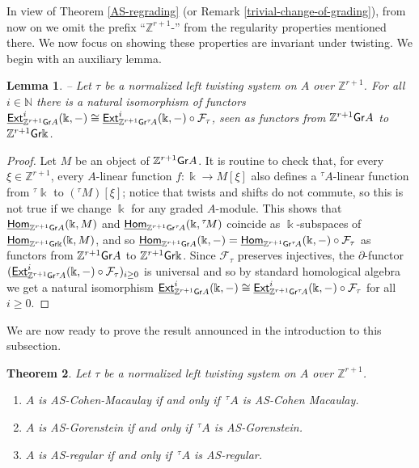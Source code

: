 \documentclass[twoside,11pt]{article}
\renewcommand{\k}{\Bbbk}
\newcommand{\N}{{\mathbb N}}
\newcommand{\Z}{{\mathbb Z}}
\newcommand{\F}{{\mathcal F}}
\newcommand{\GrMod}{{\sf Gr}}
\newcommand{\HOM}{\underline{{\sf Hom}}}
\newcommand{\EXT}{\underline{\sf Ext}}
\newtheorem{subtheorem}{Theorem}[subsection]
\newtheorem{sublemma}[subtheorem]{Lemma}
\begin{document}
In view of Theorem \ref{AS-regrading} (or Remark \ref{trivial-change-of-grading}), from
now on we omit the prefix ``$\Z^{r+1}$-'' from the regularity properties mentioned there.
We now focus on showing these properties are invariant under twisting. We begin with an
auxiliary lemma.

\begin{sublemma} -- \label{iso-pre-chi} Let $\tau$ be a normalized left twisting system on
	$A$ over $\Z^{r+1}$. For all $i\in\N$ there is a natural isomorphism of functors
	$\EXT^i_{\Z^{r+1}\GrMod A }(\k,-) \cong \EXT^i_{\Z^{r+1}\GrMod {}^\tau\!A}(\k,-)
	\circ \F_\tau$, seen as functors from $\Z^{r+1}\GrMod A$ to $\Z^{r+1}\GrMod\k$.
\end{sublemma}

\begin{proof} 
Let $M$ be an object of $\Z^{r+1}\GrMod A$. It is routine to check that, for every
$\xi \in \Z^{r+1}$, every $A$-linear function $f: \k \to M[\xi]$ also defines a ${}^\tau
A$-linear function from ${}^\tau \k$ to $({}^\tau M) [\xi]$; notice that twists and shifts
do not commute, so this is not true if we change $\k$ for any graded $A$-module. This
shows that $\HOM_{\Z^{r+1}\GrMod A}(\k,M)$ and $\HOM_{\Z^{r+1}\GrMod{}^\tau\!
A}(\k,{}^\tau\! M)$ coincide as $\k$-subspaces of $\HOM_{\Z^{r+1}\GrMod\k}(\k,M)$, and so
$\HOM_{\Z^{r+1}\GrMod A}(\k,-) = \HOM_{\Z^{r+1}\GrMod{}^\tau\!A}(\k,-) \circ \F_\tau$ as
functors from $\Z^{r+1}\GrMod A$ to $\Z^{r+1}\GrMod\k$. Since $\F_\tau$ preserves
injectives, the $\partial$-functor $(\EXT^i_{\Z^{r+1}\GrMod{}^\tau\!A}(\k,-) \circ
\F_\tau)_{i \geq 0}$ is universal and so by standard homological algebra we get a natural
isomorphism $\EXT^i_{\Z^{r+1}\GrMod A}(\k,-) \cong \EXT^i_{\Z^{r+1}\GrMod{}^\tau\!A}(\k,-)
\circ \F_\tau$ for all $i \geq 0$. 
\end{proof}

We are now ready to prove the result announced in the introduction to this subsection.
\begin{subtheorem} \label{stabilite-par-twist}
Let $\tau$ be a normalized left twisting system on $A$ over $\Z^{r+1}$. 
\begin{enumerate}
\item $A$ is AS-Cohen-Macaulay if and only if $\,{}^\tau\! A$ is AS-Cohen Macaulay.
\item $A$ is AS-Gorenstein if and only if $\,{}^\tau\! A$ is AS-Gorenstein.
\item $A$ is AS-regular if and only if $\,{}^\tau\! A$ is AS-regular.
\end{enumerate}
\end{subtheorem}
\end{document}
